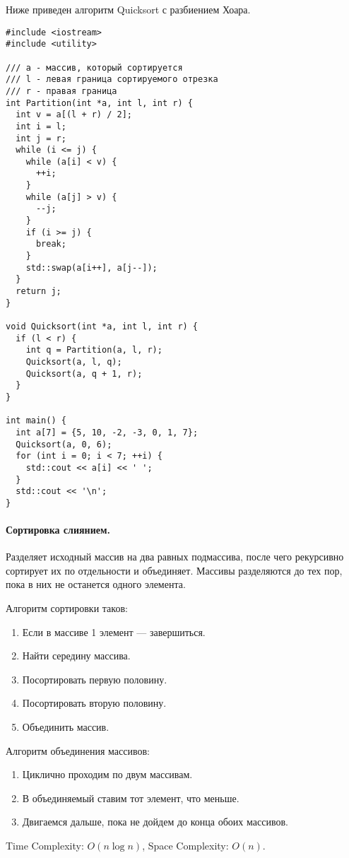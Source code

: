 Ниже приведен алгоритм Quicksort с разбиением Хоара.
\begin{verbatim}
#include <iostream>
#include <utility>

/// a - массив, который сортируется
/// l - левая граница сортируемого отрезка
/// r - правая граница
int Partition(int *a, int l, int r) {
  int v = a[(l + r) / 2];
  int i = l;
  int j = r;
  while (i <= j) {
    while (a[i] < v) {
      ++i;
    }
    while (a[j] > v) {
      --j;
    }
    if (i >= j) {
      break;
    }
    std::swap(a[i++], a[j--]);
  }
  return j;
}

void Quicksort(int *a, int l, int r) {
  if (l < r) {
    int q = Partition(a, l, r);
    Quicksort(a, l, q);
    Quicksort(a, q + 1, r);
  }
}

int main() {
  int a[7] = {5, 10, -2, -3, 0, 1, 7};
  Quicksort(a, 0, 6);
  for (int i = 0; i < 7; ++i) {
    std::cout << a[i] << ' ';
  }
  std::cout << '\n';
}
\end{verbatim}

\paragraph{Сортировка слиянием.}
Разделяет исходный массив на два равных подмассива, после чего рекурсивно сортирует их по отдельности и объединяет.
Массивы разделяются до тех пор, пока в них не останется одного элемента.

Алгоритм сортировки таков:
\begin{enumerate}
  \item Если в массиве 1 элемент --- завершиться.
  \item Найти середину массива.
  \item Посортировать первую половину.
  \item Посортировать вторую половину.
  \item Объединить массив.
\end{enumerate}

Алгоритм объединения массивов:
\begin{enumerate}
  \item Циклично проходим по двум массивам.
  \item В объединяемый ставим тот элемент, что меньше.
  \item Двигаемся дальше, пока не дойдем до конца обоих массивов.
\end{enumerate}

Time Complexity: $O(n\log n)$, Space Complexity: $O(n)$.

